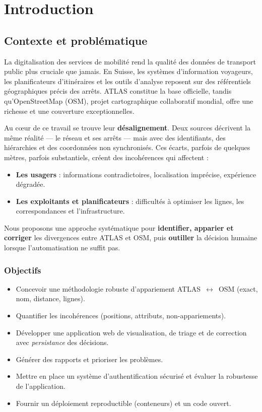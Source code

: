 
\chapter*{Introduction}

\section*{Contexte et problématique}

La digitalisation des services de mobilité rend la qualité des données de transport public plus cruciale que jamais. En Suisse, les systèmes d'information voyageurs, les planificateurs d'itinéraires et les outils d'analyse reposent sur des référentiels géographiques précis des arrêts. ATLAS constitue la base officielle, tandis qu'OpenStreetMap (OSM), projet cartographique collaboratif mondial, offre une richesse et une couverture exceptionnelles.

Au cœur de ce travail se trouve leur \textbf{désalignement}. Deux sources décrivent la même réalité — le réseau et ses arrêts — mais avec des identifiants, des hiérarchies et des coordonnées non synchronisés. Ces écarts, parfois de quelques mètres, parfois substantiels, créent des incohérences qui affectent :

\begin{itemize}
   \item \textbf{Les usagers} : informations contradictoires, localisation imprécise, expérience dégradée.
   \item \textbf{Les exploitants et planificateurs} : difficultés à optimiser les lignes, les correspondances et l'infrastructure.
\end{itemize}

Nous proposons une approche systématique pour \textbf{identifier, apparier et corriger} les divergences entre ATLAS et OSM, puis \textbf{outiller} la décision humaine lorsque l'automatisation ne suffit pas.

\subsection*{Objectifs}

\begin{itemize}
   \item Concevoir une méthodologie robuste d'appariement ATLAS~\(\leftrightarrow\)~OSM (exact, nom, distance, lignes).
   \item Quantifier les incohérences (positions, attributs, non-appariements).
   \item Développer une application web de visualisation, de triage et de correction avec \textit{persistance} des décisions.
   \item Générer des rapports et prioriser les problèmes.
   \item Mettre en place un système d'authentification sécurisé et évaluer la robustesse de l'application.
   \item Fournir un déploiement reproductible (conteneurs) et un code ouvert.
\end{itemize}

